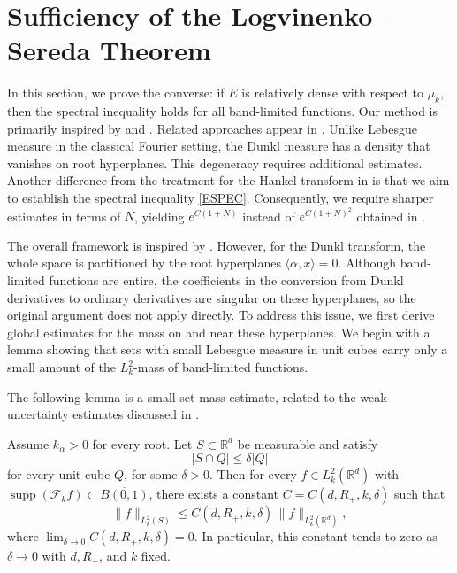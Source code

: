 \documentclass[12pt]{article}
\DeclareMathOperator{\supp}{supp}
\begin{document}
\section{Sufficiency of the Logvinenko--Sereda Theorem}
In this section, we prove the converse: if $E$ is relatively dense with respect to $\mu_k$, then the spectral inequality holds for all band-limited functions. Our method is primarily inspired by \cite{GWW} and \cite{HX}. Related approaches appear in \cite{XZ}. %
 Unlike Lebesgue measure in the classical Fourier setting, the Dunkl measure has a density that vanishes on root hyperplanes. This degeneracy requires additional estimates. %
Another difference from the treatment for the Hankel transform in \cite{HX} is that we aim to establish the spectral inequality \eqref{ESPEC}. Consequently, we require sharper estimates in terms of $N$, yielding $e^{C(1+N)}$ instead of $e^{C(1+N)^2}$ obtained in \cite{HX}.


The overall framework is inspired by \cite{GWW}. However, for the Dunkl transform, the whole space is partitioned by the root hyperplanes $\langle \alpha, x\rangle=0$. Although band-limited functions are entire, the coefficients in the conversion from Dunkl derivatives to ordinary derivatives are singular on these hyperplanes, so the original argument does not apply directly. To address this issue, we first derive global estimates for the mass on and near these hyperplanes. We begin with a lemma showing that sets with small Lebesgue measure in unit cubes carry only a small amount of the $L_k^2$-mass of band-limited functions.

The following lemma is a small-set mass estimate, related to the weak uncertainty estimates discussed in \cite{CMW1}.

\begin{lemma}
\label{lem:small-mass}
Assume $k_\alpha>0$ for every root. Let $S \subset \mathbb{R}^d$ be measurable and satisfy
\begin{equation}\label{E5}
|S \cap Q| \le \delta  |Q|
\end{equation}
for every unit cube $Q$, for some $\delta > 0$. Then for every $f \in L_k^2(\mathbb{R}^d)$ with $\supp(\mathcal{F}_k f) \subset \overline{B(0,1)}$, there exists a constant $C = C(d, R_+, k,\delta )$ such that
\[
\| f \|_{L_k^2(S)} \le C(d, R_+, k,\delta ) \, \| f \|_{L_k^2(\mathbb{R}^d)},
\]
where $\lim_{\delta \to 0} C(d, R_+, k,\delta ) = 0$. %
In particular, this constant tends to zero as $\delta\to0$ with $d,R_+$, and $k$ fixed.
\end{lemma}
\end{document}
